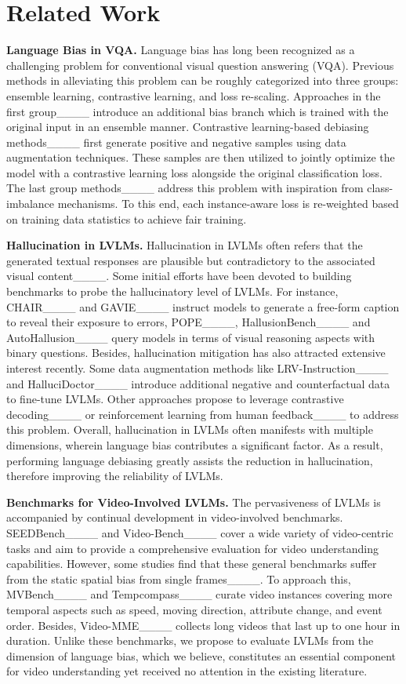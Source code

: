 \section{Related Work}
\noindent \textbf{Language Bias in VQA.} Language bias has long been recognized as a challenging problem for conventional visual question answering (VQA). Previous methods in alleviating this problem can be roughly categorized into three groups: ensemble learning, contrastive learning, and loss re-scaling. Approaches in the first group____ introduce an additional bias branch which is trained with the original input in an ensemble manner. Contrastive learning-based debiasing methods____ first generate positive and negative samples using data augmentation techniques. These samples are then utilized to jointly optimize the model with a contrastive learning loss alongside the original classification loss. The last group methods____ address this problem with inspiration from class-imbalance mechanisms. To this end, each instance-aware loss is re-weighted based on training data statistics to achieve fair training. 

\noindent \textbf{Hallucination in LVLMs.}
Hallucination in LVLMs often refers that the generated textual responses are plausible but contradictory to the associated visual content____. Some initial efforts have been devoted to building benchmarks to probe the hallucinatory level of LVLMs. For instance, CHAIR____ and GAVIE____ instruct models to generate a free-form caption to reveal their exposure to errors, POPE____, HallusionBench____ and AutoHallusion____ query models in terms of visual reasoning aspects with binary questions. Besides, hallucination mitigation has also attracted extensive interest recently. Some data augmentation methods like LRV-Instruction____ and HalluciDoctor____ introduce additional negative and counterfactual data to fine-tune LVLMs. Other approaches propose to leverage contrastive decoding____ or reinforcement learning from human feedback____ to address this problem.
Overall, hallucination in LVLMs often manifests with multiple dimensions, wherein language bias contributes a significant factor.
As a result, performing language debiasing greatly assists the reduction in hallucination, therefore improving the reliability of LVLMs.

\noindent \textbf{Benchmarks for Video-Involved LVLMs.} The pervasiveness of LVLMs is accompanied by continual development in video-involved benchmarks. SEEDBench____ and Video-Bench____ cover a wide variety of video-centric tasks and aim to provide a comprehensive evaluation for video understanding capabilities. However, some studies find that these general benchmarks suffer from the static spatial bias from single frames____. To approach this, MVBench____ and Tempcompass____ curate video instances covering more temporal aspects such as speed, moving direction, attribute change, and event order. Besides, Video-MME____ collects long videos that last up to one hour in duration. Unlike these benchmarks, we propose to evaluate LVLMs from the dimension of language bias, which we believe, constitutes an essential component for video understanding yet received no attention in the existing literature.

